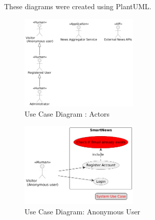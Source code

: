 These diagrams were created using PlantUML\@.



\begin{figure}[!h]
    \centering
    \includegraphics[width=0.5\textwidth]{chapters/chapter_02/use-case-smart-news-actors}
    \caption{Use Case Diagram : Actors}
    \label{fig:use-case-diagram-actors}
\end{figure}


\begin{figure}[!h]
    \centering
    \includegraphics[width=0.5\textwidth]{chapters/chapter_02/use-case-smart-news-anonymous-user}
    \caption{Use Case Diagram: Anonymous User}
    \label{fig:use-case-diagram-anonymous-user}
\end{figure}


